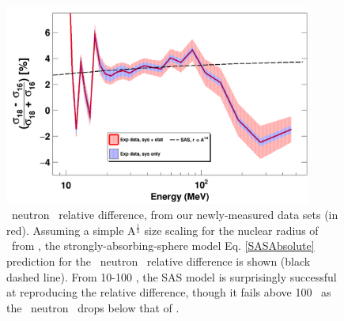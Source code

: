 \begin{figure}[tb]
    \centering
    \includegraphics[width=0.9\textwidth]{figures/relativeDiff_O18O16.png}
    \caption[\oSixEight\ neutron \tot\ relative difference]
    {\oSixEight\ neutron \tot\ relative difference, from our newly-measured
        data sets (in red). Assuming a simple A$^{\frac{1}{3}}$ size scaling for the
        nuclear radius of \oEight\ from \oSix, the strongly-absorbing-sphere model 
        Eq. \ref{SASAbsolute} prediction for the \oSixEight\ neutron \tot\ relative
        difference is shown (black dashed line). From 10-100 \mega\electronvolt, the SAS
        model is surprisingly successful at reproducing the relative difference,
        though it fails above 100 \mega\electronvolt\ as the \oEight\ neutron \tot\ drops below
    that of \oSix.}
    \label{IsotopicDifferenceO}
\end{figure}

